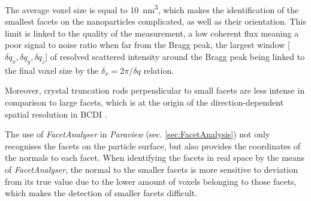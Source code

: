 The average voxel size is equal to \qty{10}{\nm^3}, which makes the identification of the smallest facets on the nanoparticles complicated, as well as their orientation.
This limit is linked to the quality of the measurement, a low coherent flux meaning a poor signal to noise ratio when far from the Bragg peak, the largest window [$\delta q_x, \delta q_y, \delta q_z$] of resolved scattered intensity around the Bragg peak being linked to the final voxel size by the $\delta_x = 2\pi/\delta q$ relation.


Moreover, crystal truncation rods perpendicular to small facets are less intense in comparison to large facets, which is at the origin of the direction-dependent spatial resolution in BCDI \parencite{Cherukara2018a}.

The use of \textit{FacetAnalyser} in \textit{Paraview} (sec. \ref{sec:FacetAnalysis}) not only recognises the facets on the particle surface, but also provides the coordinates of the normals to each facet.
When identifying the facets in real space by the means of \textit{FacetAnalyser}, the normal to the smaller facets is more sensitive to deviation from its true value due to the lower amount of voxels belonging to those facets, which makes the detection of smaller facets difficult.

